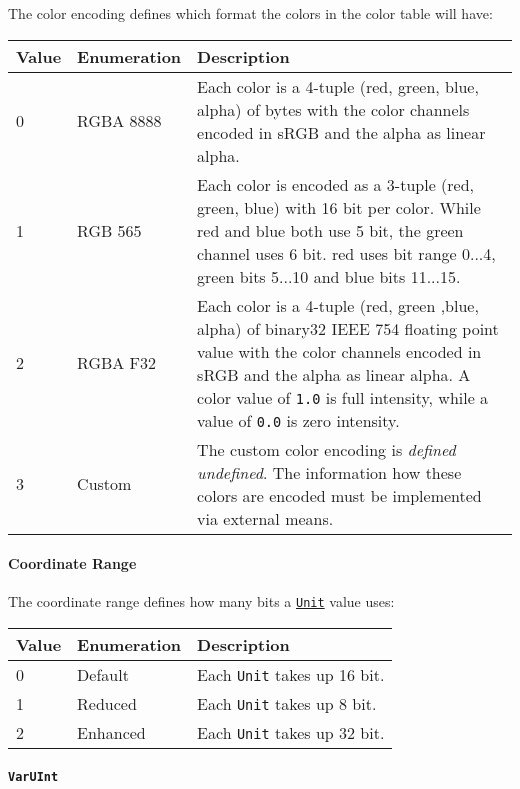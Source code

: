 \documentclass[]{article}
\begin{document}
The color encoding defines which format the colors in the color table
will have:

\begin{longtable}[]{@{}p{0.5in}p{1in}p{4.5in}@{}}
\toprule
Value & Enumeration & Description \\
\midrule
\endhead
0 & RGBA 8888 & Each color is a 4-tuple (red, green, blue, alpha) of bytes with the color channels encoded in sRGB and the alpha as linear alpha. \\
1 & RGB 565 & Each color is encoded as a 3-tuple (red, green, blue) with 16 bit per color. While red and blue both use 5 bit, the green channel uses 6 bit. red uses bit range 0...4, green bits 5...10 and blue bits 11...15. \\
2 & RGBA F32 & Each color is a 4-tuple (red, green ,blue, alpha) of binary32 IEEE 754 floating point value with the color channels encoded in sRGB and the alpha as linear alpha. A color value of \texttt{1.0} is full intensity, while a value of \texttt{0.0} is zero intensity. \\
3 & Custom & The custom color encoding is \emph{defined undefined}. The information how these colors are encoded must be implemented via external means. \\
\bottomrule
\end{longtable}

\hypertarget{coordinate-range}{\paragraph{Coordinate Range}\label{coordinate-range}}

The coordinate range defines how many bits a
\protect\hyperlink{units}{\texttt{Unit}} value uses:

\begin{longtable}[]{@{}p{1in}p{2in}p{3in}@{}}
\toprule
Value & Enumeration & Description \\
\midrule
\endhead
0 & Default & Each \texttt{Unit} takes up 16 bit. \\
1 & Reduced & Each \texttt{Unit} takes up 8 bit. \\
2 & Enhanced & Each \texttt{Unit} takes up 32 bit. \\
\bottomrule
\end{longtable}

\hypertarget{varuint}{\paragraph{\texorpdfstring{\texttt{VarUInt}}{VarUInt}}\label{varuint}}
\end{document}

